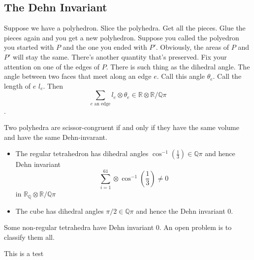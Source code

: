 \documentclass{article}
\newcommand{\Q}{\mathbb{Q}}
\newcommand{\R}{\mathbb{R}}
\begin{document}
\subsection{The Dehn Invariant}
Suppose we have a polyhedron. Slice the polyhedra. Get all the pieces. Glue the pieces again and you get a new polyhedron. Suppose you called the polyedron you started with $P$ and the one you ended with $P'$. Obviously, the areas of $P$ and $P'$ will stay the same. There's another quantity that's preserved. Fix your attention on one of the edges of $P$. There is such thing as the dihedral angle. The angle between two faces that meet along an edge $e$. Call this angle $\theta_e$. Call the length of $e$ $l_e$. Then $$\sum_{e\textrm{ an edge}}l_e\otimes \theta_e\in\R\otimes \R/\Q\pi$$.
\begin{theorem}
Two polyhedra are scissor-congruent if and only if they have the same volume and have the same Dehn-invarant.
\end{theorem}
\begin{itemize}
    \item The regular tetrahedron has dihedral angles $\cos^{-1}(\frac{1}{3})\in\Q\pi$ and hence Dehn invariant
    $$\sum_{i=1}^61\otimes\cos^{-1}(\frac{1}{3})\neq 0$$ in $\R_\Q\otimes \R/\Q\pi$
    \item The cube has dihedral angles $\pi/2\in\Q\pi$ and hence the Dehn invariant 0.
\end{itemize}
Some non-regular tetrahedra have Dehn invariant 0. An open problem is to classify them all.

This is a test
\end{document}
